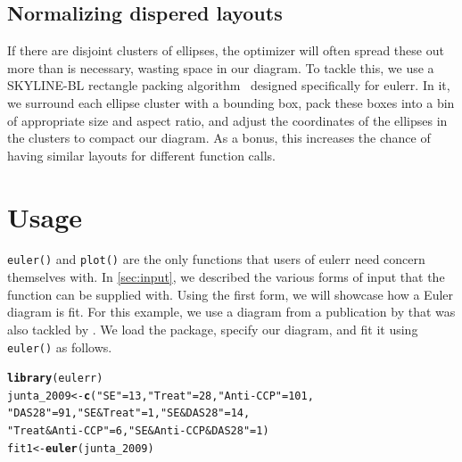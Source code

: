 \documentclass[
  oneside,
  openany,
  numbers=noendperiod,
  parskip=half,
  bibliography=totoc
]{scrbook}\usepackage[]{graphicx}\usepackage{xcolor}
\makeatletter
\newcommand{\hlnum}[1]{\textcolor[rgb]{0.686,0.059,0.569}{#1}}%
\newcommand{\hlstr}[1]{\textcolor[rgb]{0.192,0.494,0.8}{#1}}%
\newcommand{\hlstd}[1]{\textcolor[rgb]{0.345,0.345,0.345}{#1}}%
\newcommand{\hlkwb}[1]{\textcolor[rgb]{0.69,0.353,0.396}{#1}}%
\newcommand{\hlkwd}[1]{\textcolor[rgb]{0.737,0.353,0.396}{\textbf{#1}}}%
\newenvironment{kframe}{%
 \def\at@end@of@kframe{}%
 \ifinner\ifhmode%
  \def\at@end@of@kframe{\end{minipage}}%
  \begin{minipage}{\columnwidth}%
 \fi\fi%
 \def\FrameCommand##1{\hskip\@totalleftmargin \hskip-\fboxsep
 \colorbox{shadecolor}{##1}\hskip-\fboxsep
     \hskip-\linewidth \hskip-\@totalleftmargin \hskip\columnwidth}%
 \MakeFramed {\advance\hsize-\width
   \@totalleftmargin\z@ \linewidth\hsize
   \@setminipage}}%
 {\par\unskip\endMakeFramed%
 \at@end@of@kframe}
\newenvironment{knitrout}{}{} %
\newcommand{\pkg}[1]{{\fontseries{b}\selectfont #1}}
\newcommand{\code}[1]{\texttt{#1}}
\makeatother
\begin{document}
\section{Normalizing dispered layouts}
\label{sec:layout}

If there are disjoint clusters of ellipses, the optimizer will often
spread these out more than is necessary, wasting space in our diagram. To
tackle this, we
use a SKYLINE-BL rectangle packing algorithm~\citep{Jylaenki_2010}
designed specifically for \pkg{eulerr}. In it, we surround each ellipse cluster
with a bounding box, pack these boxes into a bin of appropriate size and
aspect ratio, and adjust the coordinates of the ellipses in the clusters to
compact our diagram. As a bonus, this increases the chance of having
similar layouts for different function calls.

\chapter{Usage}\label{ch:usage}

\code{euler()} and \code{plot()} are the only functions that users of
\pkg{eulerr} need concern themselves with. In \cref{sec:input}, we described
the various forms of input that the function can be supplied with. Using the
first form, we will showcase how a Euler diagram is fit. For this example,
we use a diagram from a publication by \citet{Junta_2009} that was also
tackled by \citet{Wilkinson_2012}. We load the package,
specify our diagram, and fit it using \code{euler()} as follows.

\begin{knitrout}\small
{}\color{fgcolor}\begin{kframe}
\begin{alltt}
\hlkwd{library}\hlstd{(eulerr)}
\hlstd{junta_2009} \hlkwb{<-} \hlkwd{c}\hlstd{(}\hlstr{"SE"} \hlstd{=} \hlnum{13}\hlstd{,} \hlstr{"Treat"} \hlstd{=} \hlnum{28}\hlstd{,} \hlstr{"Anti-CCP"} \hlstd{=} \hlnum{101}\hlstd{,}
                \hlstr{"DAS28"} \hlstd{=} \hlnum{91}\hlstd{,} \hlstr{"SE&Treat"} \hlstd{=} \hlnum{1}\hlstd{,} \hlstr{"SE&DAS28"} \hlstd{=} \hlnum{14}\hlstd{,}
                \hlstr{"Treat&Anti-CCP"} \hlstd{=} \hlnum{6}\hlstd{,} \hlstr{"SE&Anti-CCP&DAS28"} \hlstd{=} \hlnum{1}\hlstd{)}
\hlstd{fit1} \hlkwb{<-} \hlkwd{euler}\hlstd{(junta_2009)}
\end{alltt}
\end{kframe}
\end{knitrout}
\end{document}
